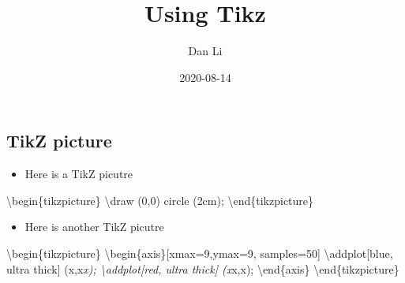 \documentclass[
]{article}
\title{Using Tikz}
\author{Dan Li}
\date{2020-08-14}
\providecommand{\tightlist}{%
  \setlength{\itemsep}{0pt}\setlength{\parskip}{0pt}}
\begin{document}
\maketitle

\hypertarget{tikz-picture}{%
\subsection{TikZ picture}\label{tikz-picture}}

\begin{itemize}
\tightlist
\item
  Here is a TikZ picutre
\end{itemize}

\textbackslash begin\{tikzpicture\} \textbackslash draw (0,0) circle
(2cm); \textbackslash end\{tikzpicture\}


\begin{itemize}
\tightlist
\item
  Here is another TikZ picutre
\end{itemize}

\textbackslash begin\{tikzpicture\}
\textbackslash begin\{axis\}{[}xmax=9,ymax=9, samples=50{]}
\textbackslash addplot{[}blue, ultra thick{]} (x,x\emph{x);
\textbackslash addplot{[}red, ultra thick{]} (x}x,x);
\textbackslash end\{axis\} \textbackslash end\{tikzpicture\}

\end{document}
